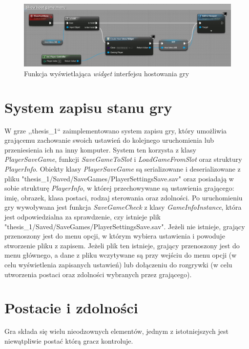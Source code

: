 \documentclass[multip]{SGGW-thesis}
\begin{document}
	\begin{figure}
		\centering
			\includegraphics[width=1\textwidth]{figures/showhostmenu.jpg}
		\caption{Funkcja wyświetlająca {\em widget} interfejsu hostowania gry}
		\label{fig-show-host-menu}
	\end{figure}

\clearpage
\section{System zapisu stanu gry}
	\label{sejwy}
	W grze ,,thesis\_1`` zaimplementowano system zapisu gry, który umożliwia grającemu zachowanie swoich ustawień do kolejnego uruchomienia lub przeniesienia ich na inny komputer. System ten korzysta z klasy {\em PlayerSaveGame}, funkcji {\em SaveGameToSlot} i {\em LoadGameFromSlot} oraz struktury {\em PlayerInfo}. Obiekty klasy {\em PlayerSaveGame} są serializowane i deserializowane z pliku "thesis\_1/Saved/SaveGames/PlayerSettingsSave.sav" oraz posiadają w sobie strukturę {\em PlayerInfo}, w której przechowywane są ustawienia grającego: imię, obrazek, klasa postaci, rodzaj sterowania oraz zdolności.
	\newline Po uruchomieniu gry wywoływana jest funkcja {\em SaveGameCheck} z klasy {\em GameInfoInstance}, która jest odpowiedzialna za sprawdzenie, czy istnieje plik \newline "thesis\_1/Saved/SaveGames/PlayerSettingsSave.sav". Jeżeli nie istnieje, grający przenoszony jest do menu opcji, w którym wybiera ustawienia i powoduje stworzenie pliku z zapisem. Jeżeli plik ten istnieje, grający przenoszony jest do menu głównego, a dane z pliku wczytywane są przy wejściu do menu opcji (w celu wyświetlenia zapisanych ustawień) lub dołączeniu do rozgrywki (w celu utworzenia postaci oraz zdolności wybranych przez grającego). 
\section{Postacie i zdolności}
	\label{characters-skills}
Gra składa się wielu nieodzownych elementów, jednym z istotniejszych jest niewątpliwie postać którą gracz kontroluje.
\end{document}
